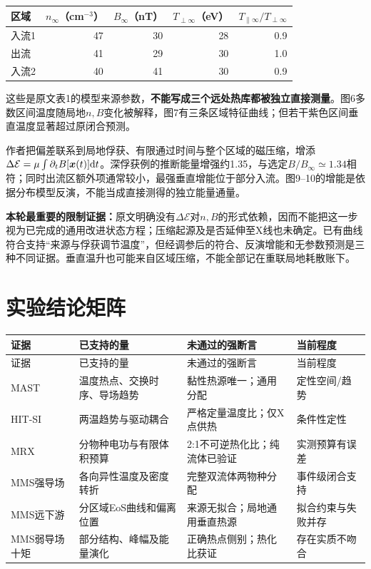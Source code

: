 \begin{center}
\begin{tabular}{lrrrr}\toprule
区域 &$n_\infty$（cm$^{-3}$）&$B_\infty$（nT）&$T_{\perp\infty}$（eV）&$T_{\parallel\infty}/T_{\perp\infty}$\\\midrule
入流1 &47&30&28&0.9\\
出流 &41&29&30&1.0\\
入流2 &40&41&30&0.9\\\bottomrule
\end{tabular}
\end{center}

这些是原文表1的模型来源参数，\textbf{不能写成三个远处热库都被独立直接测量}。图6多数区间温度随局地$n,B$变化被解释，图7有三条区域特征曲线；但若干紫色区间垂直温度显著超过原闭合预测。

作者把偏差联系到局地俘获、有限通过时间与整个区域的磁压缩，增添$\Delta\mathcal E=\mu\int\partial_tB[\bm{x}(t)]\mathrm d t$。深俘获例的推断能量增强约1.35，与选定$B/B_\infty\simeq1.34$相符；同时出流区额外项通常较小，最强垂直增能位于部分入流。图9--10的增能是依据分布模型反演，不能当成直接测得的独立能量通量。

\textbf{本轮最重要的限制证据：}原文明确没有$\Delta\mathcal E$对$n,B$的形式依赖，因而不能把这一步视为已完成的通用改进状态方程；压缩起源及是否延伸至X线也未确定。已有曲线符合支持“来源与俘获调节温度”，但经调参后的符合、反演增能和无参数预测是三种不同证据。垂直温升也可能来自区域压缩，不能全部记在重联局地耗散账下。

\section{实验结论矩阵}
\begin{longtable}{P{23mm}P{46mm}P{40mm}P{33mm}}
\toprule 证据 & 已支持的量 & 未通过的强断言 & 当前程度\\\midrule\endfirsthead
\toprule 证据 & 已支持的量 & 未通过的强断言 & 当前程度\\\midrule\endhead
MAST & 温度热点、交换时序、导场趋势 & 黏性热源唯一；通用分配 & 定性空间/趋势\\
HIT-SI & 两温趋势与驱动耦合 & 严格定量温度比；仅X点供热 & 条件性定性\\
MRX & 分物种电功与有限体积预算 & 2:1不可逆热化比；纯流体已验证 & 实测预算有误差\\
MMS强导场 & 各向异性温度及密度转折 & 完整双流体两物种分配 & 事件级闭合支持\\
MMS远下游 & 分区域EoS曲线和偏离位置 & 来源无拟合；局地通用垂直热源 & 拟合约束与失败并存\\
MMS弱导场十矩 & 部分结构、峰幅及能量演化 & 正确热点侧别；热化比获证 & 存在实质不吻合\\
\bottomrule\end{longtable}
